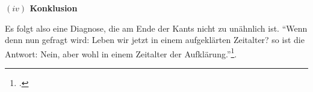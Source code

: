 \documentclass[a4paper, 12pt]{article}
\begin{document}
\begin{onehalfspace}
\vspace{5mm}
\noindent\textbf{$(iv)$ Konklusion}

\noindent Es folgt also eine Diagnose, die am Ende der Kants nicht zu unähnlich ist. "`Wenn denn nun gefragt wird: Leben wir jetzt in einem aufgeklärten Zeitalter? so ist die Antwort: Nein, aber wohl in einem Zeitalter der Aufklärung."'\footnote{\Cite[Siehe][S. 491]{kant}.}.



\end{onehalfspace}
\nocite{*}
\printbibliography
\end{document}
